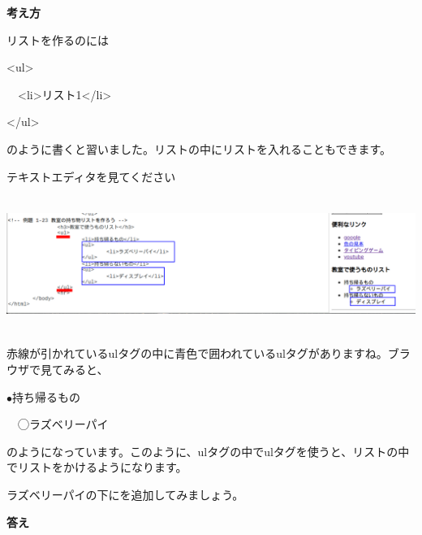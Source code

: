 \documentclass[a4paper,12pt]{jarticle}
\begin{document}
\bigskip
\flushleft

\textbf{考え方}



リストを作るのには

{\textless}ul{\textgreater}

\ \ {\textless}li{\textgreater}リスト1{\textless}/li{\textgreater}

{\textless}/ul{\textgreater}

のように書くと習いました。リストの中にリストを入れることもできます。

テキストエディタを見てください

\bigskip

\centering
\includegraphics[width=15.519cm,height=4.383cm]{textbook-img204.png}

\bigskip
\flushleft

赤線が引かれているulタグの中に青色で囲われているulタグがありますね。ブラウザで見てみると、

${\bullet}持ち帰るもの$

\ \ ◯ラズベリーパイ

のようになっています。このように、ulタグの中でulタグを使うと、リストの中でリストをかけるようになります。

ラズベリーパイの下にを追加してみましょう。


\bigskip


\clearpage\flushleft
\textbf{答え}


\bigskip
\end{document}
